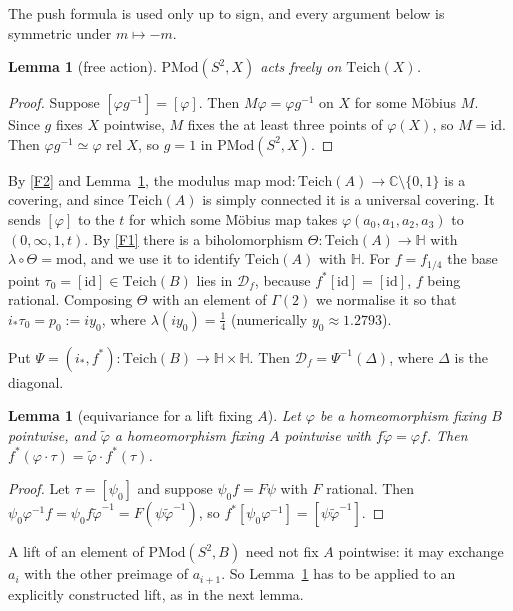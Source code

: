 \documentclass[11pt]{article}
\newtheorem{lemma}[proposition]{Lemma}
\theoremstyle{definition}
\newcommand{\Teich}{\mathrm{Teich}}
\newcommand{\PMod}{\mathrm{PMod}}
\newcommand{\HH}{\mathbb H}
\newcommand{\D}{\mathcal D}
\begin{document}
The push formula is used only up to sign, and every argument below is symmetric under $m\mapsto-m$.

\begin{lemma}[free action]\label{lem:free}
$\PMod(S^2,X)$ acts freely on $\Teich(X)$.
\end{lemma}

\begin{proof}
Suppose $[\varphi g^{-1}]=[\varphi]$. Then $M\varphi=\varphi g^{-1}$ on $X$ for some M\"obius $M$. Since $g$ fixes $X$ pointwise, $M$ fixes the at least three points of $\varphi(X)$, so $M=\mathrm{id}$. Then $\varphi g^{-1}\simeq\varphi$ rel $X$, so $g=1$ in $\PMod(S^2,X)$.
\end{proof}

By \ref{F2} and Lemma~\ref{lem:free}, the modulus map $\mathrm{mod}\colon\Teich(A)\to\mathbb C\setminus\{0,1\}$ is a covering, and since $\Teich(A)$ is simply connected it is a universal covering. It sends $[\varphi]$ to the $t$ for which some M\"obius map takes $\varphi(a_0,a_1,a_2,a_3)$ to $(0,\infty,1,t)$. By \ref{F1} there is a biholomorphism $\Theta\colon\Teich(A)\to\HH$ with $\lambda\circ\Theta=\mathrm{mod}$, and we use it to identify $\Teich(A)$ with $\HH$. For $f=f_{1/4}$ the base point $\tau_0=[\mathrm{id}]\in\Teich(B)$ lies in $\D_f$, because $f^*[\mathrm{id}]=[\mathrm{id}]$, $f$ being rational. Composing $\Theta$ with an element of $\Gamma(2)$ we normalise it so that $i_*\tau_0=p_0:=iy_0$, where $\lambda(iy_0)=\tfrac14$ (numerically $y_0\approx1.2793$).

Put $\Psi=(i_*,f^*)\colon\Teich(B)\to\HH\times\HH$. Then $\D_f=\Psi^{-1}(\Delta)$, where $\Delta$ is the diagonal.

\begin{lemma}[equivariance for a lift fixing $A$]\label{lem:equiv}
Let $\varphi$ be a homeomorphism fixing $B$ pointwise, and $\tilde\varphi$ a homeomorphism fixing $A$ pointwise with $f\tilde\varphi=\varphi f$. Then $f^*(\varphi\cdot\tau)=\tilde\varphi\cdot f^*(\tau)$.
\end{lemma}

\begin{proof}
Let $\tau=[\psi_0]$ and suppose $\psi_0 f=F\psi$ with $F$ rational. Then $\psi_0\varphi^{-1}f=\psi_0 f\tilde\varphi^{-1}=F(\psi\tilde\varphi^{-1})$, so $f^*[\psi_0\varphi^{-1}]=[\psi\tilde\varphi^{-1}]$.
\end{proof}

A lift of an element of $\PMod(S^2,B)$ need not fix $A$ pointwise: it may exchange $a_i$ with the other preimage of $a_{i+1}$. So Lemma~\ref{lem:equiv} has to be applied to an explicitly constructed lift, as in the next lemma.
\end{document}
